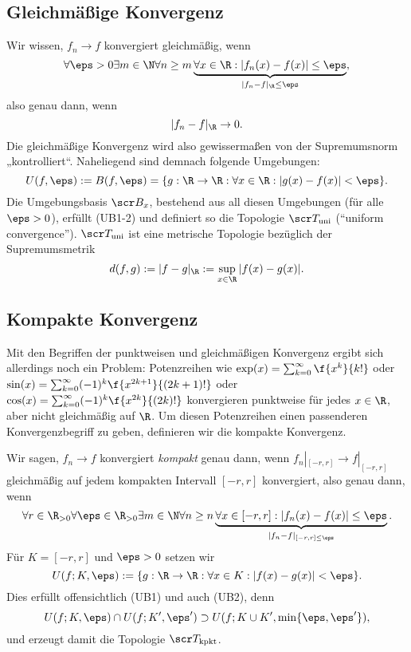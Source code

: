 \subsection{Gleichmäßige Konvergenz}

Wir wissen, $f_n \to f$ konvergiert gleichmäßig, wenn
\[
	\forall \eps > 0 \exists m \in \N \forall n \ge m \underbrace{\forall x \in \R : |f_n(x) - f(x) | \le \eps}_{|f_n - f|_{\R} \le \eps},
\]
also genau dann, wenn
\[
	|f_n-f|_{\R} \to 0.
\]
Die gleichmäßige Konvergenz wird also gewissermaßen von der Supremumsnorm „kontrolliert“.
Naheliegend sind demnach folgende Umgebungen:
\[
	U(f,\eps)
	:= B(f,\eps)
	= \{ g : \R \to \R : \forall x \in \R : |g(x) - f(x)| < \eps \}.
\]
Die Umgebungsbasis $\scr B_x$, bestehend aus all diesen Umgebungen (für alle $\eps > 0$), erfüllt (UB1-2) und definiert so die Topologie $\scr T_{\text{uni}}$ (“uniform convergence”).
$\scr T_{\text{uni}}$ ist eine metrische Topologie bezüglich der Supremumsmetrik
\[
	d(f,g)
	:= |f-g|_{\R}
	:= \sup_{x\in\R} |f(x) - g(x)|.
\]

\subsection{Kompakte Konvergenz}

Mit den Begriffen der punktweisen und gleichmäßigen Konvergenz ergibt sich allerdings noch ein Problem:
Potenzreihen wie $\exp(x) = \sum_{k=0}^\infty \f {x^k}{k!}$ oder $\sin(x) = \sum_{k=0}^\infty (-1)^k \f {x^{2k+1}}{(2k+1)!}$ oder $\cos (x) = \sum_{k=0}^\infty (-1)^k \f {x^{2k}}{(2k)!}$ konvergieren punktweise für jedes $x \in \R$, aber nicht gleichmäßig auf $\R$.
Um diesen Potenzreihen einen passenderen Konvergenzbegriff zu geben, definieren wir die kompakte Konvergenz.

Wir sagen, $f_n \to f$ konvergiert \emph{kompakt} genau dann, wenn $f_n|_{[-r,r]} \to f|_{[-r,r]}$ gleichmäßig auf jedem kompakten Intervall $[-r,r]$ konvergiert, also genau dann, wenn
\[
	\forall r \in \R_{>0} \forall \eps \in \R_{>0} \exists m \in \N \forall n \ge n \underbrace{\forall x \in [-r,r] : |f_n(x) - f(x)| \le \eps}_{|f_n-f|_{[-r,r]\le \eps}}.
\]
Für $K = [-r,r]$ und $\eps > 0$ setzen wir
\[
	U(f; K, \eps)
	:= \{ g: \R \to \R : \forall x \in K : |f(x) - g(x)| < \eps \}.
\]
Dies erfüllt offensichtlich (UB1) und auch (UB2), denn
\[
	U(f;K,\eps) \cap U(f;K',\eps')
	\supset U(f; K \cup K', \min\{\eps, \eps'\}),
\]
und erzeugt damit die Topologie $\scr T_{\text{kpkt}}$.

